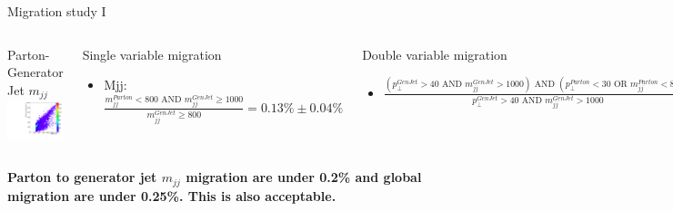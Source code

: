 \documentclass[8pt]{beamer}
\begin{document}
\begin{frame}{Migration study I}

\begin{columns}
  
  \centering
 
  \begin{block}{Parton-Generator Jet $m_{jj}$}
    \centering
    \includegraphics[width=1.0\linewidth]{img/migrations/SelDiParton_MatchedGenJet_Mjj.pdf}
  \end{block}

  \centering
  \begin{block}{Single variable migration}
  
    \begin{itemize}
      \item[] \tiny{Mjj: $\frac{m_{jj}^{Parton}<800 \text{ AND } m_{jj}^{GenJet} \geq 1000}{m_{jj}^{GenJet} \geq 800}=0.13\% \pm 0.04\%$  }
    \end{itemize}

  \end{block}
  
  \begin{block}{Double variable migration}
    
    \begin{itemize}
      \item \tiny{$\frac{(p_{\perp}^{GenJet}>40 \text{ AND } m_{jj}^{GenJet}>1000) \text{ AND } (p_{\perp}^{Parton}<30 \text{ OR } m_{jj}^{Parton}<800)}{p_{\perp}^{GenJet}>40 \text{ AND } m_{jj}^{GenJet}>1000} = 0.23\% \pm 0.13\%$}
    \end{itemize}

  \end{block}
  
\end{columns}

\begin{center}
\textbf{Parton to generator jet $m_{jj}$ migration are under 0.2\% and global migration are under 0.25\%. This is also acceptable.}
\end{center}

\end{frame}
\end{document}
